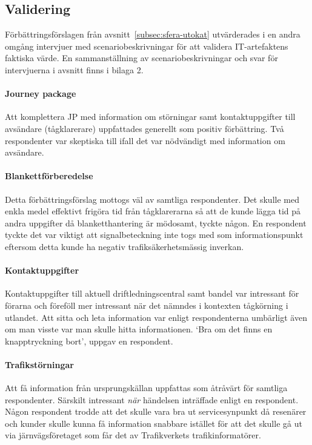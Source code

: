 \subsection{Validering}
Förbättringsförslagen från avsnitt~\ref{subsec:sfera-utokat} utvärderades i en andra omgång intervjuer med scenariobeskrivningar för att validera IT-artefaktens faktiska värde.
En sammanställning av scenariobeskrivningar och svar för intervjuerna i avsnitt finns i bilaga 2.
\paragraph{Journey package}
Att komplettera JP med information om störningar samt kontaktuppgifter till avsändare (tågklarerare) uppfattades generellt som positiv förbättring.
Två respondenter var skeptiska till ifall det var nödvändigt med information om avsändare.
\paragraph{Blankettförberedelse}
Detta förbättringsförslag mottogs väl av samtliga respondenter.
Det skulle med enkla medel effektivt frigöra tid från tågklarerarna så att de kunde lägga tid på andra uppgifter då blanketthantering är mödosamt, tyckte någon.
En respondent tyckte det var viktigt att signalbeteckning inte togs med som informationspunkt eftersom detta kunde ha negativ trafiksäkerhetsmässig inverkan.
\paragraph{Kontaktuppgifter}
Kontaktuppgifter till aktuell driftledningscentral samt bandel var intressant för förarna och föreföll mer intressant när det nämndes i kontexten tågkörning i utlandet.
Att sitta och leta information var enligt respondenterna umbärligt även om man visste var man skulle hitta informationen.
\lq{}Bra om det finns en knapptryckning bort\rq{}, uppgav en respondent.
\paragraph{Trafikstörningar}
Att få information från ursprungskällan uppfattas som åtråvärt för samtliga respondenter.
Särskilt intressant \emph{när} händelsen inträffade enligt en respondent.
Någon respondent trodde att det skulle vara bra ut servicesynpunkt då resenärer och kunder skulle kunna få information snabbare istället för att det skulle gå ut via järnvägsföretaget som får det av Trafikverkets trafikinformatörer.
